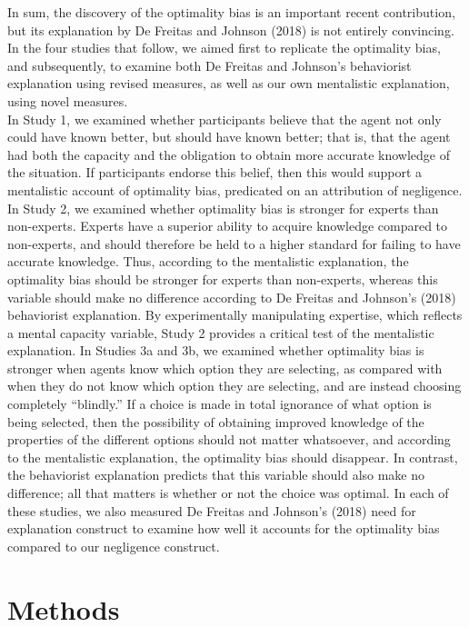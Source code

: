 \documentclass[
  man,floatsintext]{apa6}
\begin{document}
In sum, the discovery of the optimality bias is an important recent contribution, but its explanation by De Freitas and Johnson (2018) is not entirely convincing. In the four studies that follow, we aimed first to replicate the optimality bias, and subsequently, to examine both De Freitas and Johnson's behaviorist explanation using revised measures, as well as our own mentalistic explanation, using novel measures.\\
In Study 1, we examined whether participants believe that the agent not only could have known better, but should have known better; that is, that the agent had both the capacity and the obligation to obtain more accurate knowledge of the situation. If participants endorse this belief, then this would support a mentalistic account of optimality bias, predicated on an attribution of negligence. In Study 2, we examined whether optimality bias is stronger for experts than non-experts. Experts have a superior ability to acquire knowledge compared to non-experts, and should therefore be held to a higher standard for failing to have accurate knowledge. Thus, according to the mentalistic explanation, the optimality bias should be stronger for experts than non-experts, whereas this variable should make no difference according to De Freitas and Johnson's (2018) behaviorist explanation. By experimentally manipulating expertise, which reflects a mental capacity variable, Study 2 provides a critical test of the mentalistic explanation. In Studies 3a and 3b, we examined whether optimality bias is stronger when agents know which option they are selecting, as compared with when they do not know which option they are selecting, and are instead choosing completely ``blindly.'' If a choice is made in total ignorance of what option is being selected, then the possibility of obtaining improved knowledge of the properties of the different options should not matter whatsoever, and according to the mentalistic explanation, the optimality bias should disappear. In contrast, the behaviorist explanation predicts that this variable should also make no difference; all that matters is whether or not the choice was optimal. In each of these studies, we also measured De Freitas and Johnson's (2018) need for explanation construct to examine how well it accounts for the optimality bias compared to our negligence construct.

\hypertarget{methods}{%
\section{Methods}\label{methods}}
\end{document}
